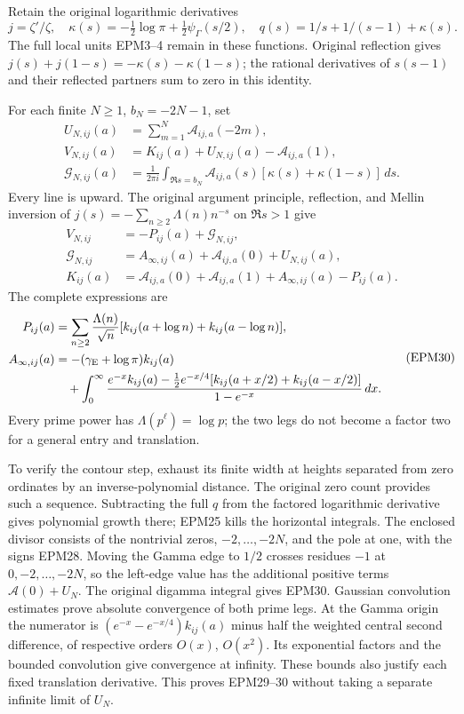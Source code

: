 \documentclass[
  10pt,
  a4paper,
]{article}
\begin{document}
Retain the original logarithmic derivatives \[
j=\zeta'/\zeta,\quad
\kappa(s)=-\tfrac12\log\pi+\tfrac12\psi_\Gamma(s/2),\quad
q(s)=1/s+1/(s-1)+\kappa(s).
\tag{EPM27}
\] The full local units EPM3--4 remain in these functions. Original
reflection gives \(j(s)+j(1-s)=-\kappa(s)-\kappa(1-s)\); the rational
derivatives of \(s(s-1)\) and their reflected partners sum to zero in
this identity.

For each finite \(N\ge1\), \(b_N=-2N-1\), set \[
\begin{aligned}
U_{N,ij}(a)&=\sum_{m=1}^N\mathcal A_{ij,a}(-2m),\\
V_{N,ij}(a)&=K_{ij}(a)+U_{N,ij}(a)-\mathcal A_{ij,a}(1),\\
\mathcal G_{N,ij}(a)&=\frac1{2\pi i}\int_{\Re s=b_N}
\mathcal A_{ij,a}(s)[\kappa(s)+\kappa(1-s)]\,ds .
\end{aligned}\tag{EPM28}
\] Every line is upward. The original argument principle, reflection,
and Mellin inversion of \(j(s)=-\sum_{n\ge2}\Lambda(n)n^{-s}\) on
\(\Re s>1\) give \[
\begin{aligned}
V_{N,ij}&=-P_{ij}(a)+\mathcal G_{N,ij},\\
\mathcal G_{N,ij}&=A_{\infty,ij}(a)+\mathcal A_{ij,a}(0)+U_{N,ij}(a),\\
K_{ij}(a)&=\mathcal A_{ij,a}(0)+\mathcal A_{ij,a}(1)
+A_{\infty,ij}(a)-P_{ij}(a).
\end{aligned}\tag{EPM29}
\] The complete expressions are \[
\begin{aligned}
P_{ij}(a)&=\sum_{n\ge2}\frac{\Lambda(n)}{\sqrt n}
[k_{ij}(a+\log n)+k_{ij}(a-\log n)],\\
A_{\infty,ij}(a)&=-(\gamma_{\rm E}+\log\pi)k_{ij}(a)\\
&\quad+\int_0^\infty
\frac{e^{-x}k_{ij}(a)-\tfrac12e^{-x/4}
[k_{ij}(a+x/2)+k_{ij}(a-x/2)]}{1-e^{-x}}\,dx .
\end{aligned}\tag{EPM30}
\] Every prime power has \(\Lambda(p^\ell)=\log p\); the two legs do not
become a factor two for a general entry and translation.

To verify the contour step, exhaust its finite width at heights
separated from zero ordinates by an inverse-polynomial distance. The
original zero count provides such a sequence. Subtracting the full \(q\)
from the factored logarithmic derivative gives polynomial growth there;
EPM25 kills the horizontal integrals. The enclosed divisor consists of
the nontrivial zeros, \(-2,\ldots,-2N\), and the pole at one, with the
signs EPM28. Moving the Gamma edge to \(1/2\) crosses residues \(-1\) at
\(0,-2,\ldots,-2N\), so the left-edge value has the additional positive
terms \(\mathcal A(0)+U_N\). The original digamma integral gives EPM30.
Gaussian convolution estimates prove absolute convergence of both prime
legs. At the Gamma origin the numerator is
\((e^{-x}-e^{-x/4})k_{ij}(a)\) minus half the weighted central second
difference, of respective orders \(O(x)\), \(O(x^2)\). Its exponential
factors and the bounded convolution give convergence at infinity. These
bounds also justify each fixed translation derivative. This proves
EPM29--30 without taking a separate infinite limit of \(U_N\).
\end{document}
